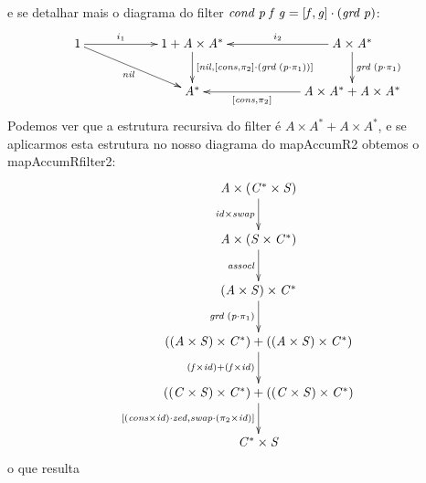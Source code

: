 \documentclass[11pt, a4paper, fleqn]{article}
\newcommand{\Conid}[1]{\mathit{#1}}
\newcommand{\Varid}[1]{\mathit{#1}}
\begin{document}
e se detalhar mais o diagrama do filter \ensuremath{\Varid{cond}\;\Varid{p}\;\Varid{f}\;\Varid{g}\mathrel{=}\alt{\Varid{f}}{\Varid{g}}\comp (\Varid{grd}\;\Varid{p})}:
\begin{eqnarray*}
\xymatrix@C=2cm{
     \ensuremath{\mathrm{1}}
           \ar[r]^-{\ensuremath{i_1}}
           \ar[dr]_-{\ensuremath{\Varid{nil}}}
&
     \ensuremath{\mathrm{1}\mathbin{+}\Conid{A}\times{\Conid{A}}^{*}}
           \ar[d]^-{\ensuremath{\alt{\Varid{nil}}{\alt{\Varid{cons}}{\p2}\comp (\Varid{grd}\;(\Varid{p}\comp \p1))}}}
&
     \ensuremath{\Conid{A}\times{\Conid{A}}^{*}}
           \ar[l]_-{\ensuremath{i_2}}
           \ar[d]^-{\ensuremath{\Varid{grd}\;(\Varid{p}\comp \p1)}}
\\  & 
     \ensuremath{{\Conid{A}}^{*}}
&
     \ensuremath{\Conid{A}\times{\Conid{A}}^{*}\mathbin{+}\Conid{A}\times{\Conid{A}}^{*}}
          \ar[l]^-{\ensuremath{\alt{\Varid{cons}}{\p2}}}
}
\end{eqnarray*}
Podemos ver que a estrutura recursiva do filter é 
\ensuremath{\Conid{A}\times{\Conid{A}}^{*}\mathbin{+}\Conid{A}\times{\Conid{A}}^{*}}, 
e se aplicarmos esta estrutura no nosso diagrama do mapAccumR2 obtemos o mapAccumRfilter2:
\begin{eqnarray*}
\xymatrix@C=2cm{
     \ensuremath{\Conid{A}\times({\Conid{C}}^{*}\times\Conid{S})}
           \ar[d]_-{\ensuremath{\Varid{id}\times\Varid{swap}}}
\\
     \ensuremath{\Conid{A}\times(\Conid{S}\times{\Conid{C}}^{*})}
           \ar[d]_-{\ensuremath{\Varid{assocl}}}
\\
     \ensuremath{(\Conid{A}\times\Conid{S})\times{\Conid{C}}^{*}}
           \ar[d]_-{\ensuremath{\Varid{grd}\;(\Varid{p}\comp \p1)}}
\\
     \ensuremath{((\Conid{A}\times\Conid{S})\times{\Conid{C}}^{*})\mathbin{+}((\Conid{A}\times\Conid{S})\times{\Conid{C}}^{*})}
           \ar[d]_-{\ensuremath{(\Varid{f}\times\Varid{id})\mathbin{+}(\Varid{f}\times\Varid{id})}}
\\
     \ensuremath{((\Conid{C}\times\Conid{S})\times{\Conid{C}}^{*})\mathbin{+}((\Conid{C}\times\Conid{S})\times{\Conid{C}}^{*})}
           \ar[d]_-{\ensuremath{\alt{(\Varid{cons}\times\Varid{id})\comp \Varid{zed}}{\Varid{swap}\comp (\p2\times\Varid{id})}}}
\\
     \ensuremath{{\Conid{C}}^{*}\times\Conid{S}}
}
\end{eqnarray*}
o que resulta
\end{document}
